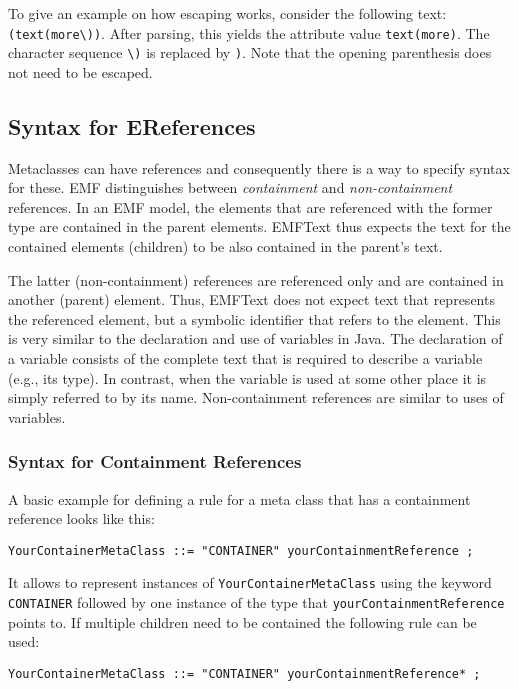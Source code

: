To give an example on how escaping works, consider the following text:
\texttt{(text(more\textbackslash{}))}. After parsing, this yields the attribute
value \texttt{text(more)}. The character sequence \texttt{\textbackslash{})} is
replaced by \texttt{)}. Note that the opening parenthesis does not need to be
escaped.

\subsection{Syntax for EReferences}

Metaclasses can have references and consequently there is a way to specify 
syntax for these. EMF distinguishes between \emph{containment} and
\emph{non-containment} references. In an EMF model, the elements that are
referenced with the former type are contained in the parent elements. EMFText
thus expects the text for the contained elements (children) to be also 
contained in the parent's text. 

The latter (non-containment) references are referenced only and are contained in
another (parent) element. Thus, EMFText does not expect text that
represents the referenced element, but a symbolic identifier that refers
to the element. This is very similar to the declaration and use of variables in Java.
The declaration of a variable consists of the complete text that is required to
describe a variable (e.g., its type). In contrast, when the variable is used at
some other place it is simply referred to by its name. Non-containment
references are similar to uses of variables.

\subsubsection{Syntax for Containment References}

A basic example for defining a rule for a meta class that has a containment 
reference looks like this:

\begin{lstlisting}
YourContainerMetaClass ::= "CONTAINER" yourContainmentReference ;
\end{lstlisting}

It allows to represent instances of \texttt{YourContainerMetaClass} using the
keyword \texttt{CONTAINER} followed by one instance of the type that
\texttt{yourContainmentReference} points to. If multiple children need to be
contained the following rule can be used:

\begin{lstlisting}
YourContainerMetaClass ::= "CONTAINER" yourContainmentReference* ;
\end{lstlisting}

